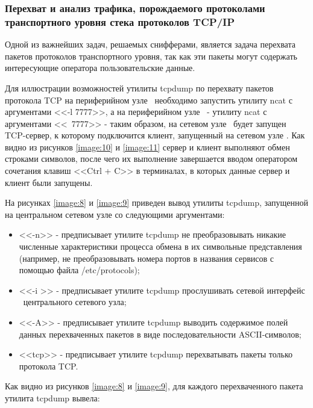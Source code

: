 \subsubsection{Перехват и анализ трафика, порождаемого протоколами транспортного уровня стека протоколов TCP/IP}
\label{task:l4t2}

	Одной из важнейших задач, решаемых снифферами, является задача перехвата пакетов протоколов транспортного уровня,
	так как эти пакеты могут содержать интересующие оператора пользовательские данные.

	Для иллюстрации возможностей утилиты tcpdump по перехвату пакетов протокола TCP на периферийном узле
	\first\ необходимо запустить утилиту ncat с аргументами <<-l 7777>>, а на периферийном узле \second\ - утилиту ncat
	с аргументами <<\first\ 7777>> - таким образом, на сетевом узле \first\ будет запущен TCP-сервер, к которому
	подключится клиент, запущенный на сетевом узле \second.
	Как видно из рисунков \ref{image:10} и \ref{image:11} сервер и клиент выполняют обмен строками символов,
	после чего их выполнение завершается вводом оператором сочетания клавиш <<Ctrl + C>> в терминалах, в которых
	данные сервер и клиент были запущены.

	На рисунках \ref{image:8} и \ref{image:9} приведен вывод утилиты tcpdump, запущенной на центральном сетевом узле
	со следующими аргументами:

		\begin{itemize}

			\item <<-n>> - предписывает утилите tcpdump не преобразовывать никакие численные характеристики процесса
			обмена в их символьные представления (например, не преобразовывать номера портов в названия сервисов с
			помощью файла /etc/protocols);
			\item <<-i \midethf>> - предписывает утилите tcpdump прослушивать сетевой интерфейс \midethf\ центрального
			сетевого узла;
			\item <<-A>> - предписывает утилите tcpdump выводить содержимое полей данных перехваченных пакетов в виде
			последовательности ASCII-символов;
			\item <<tcp>> - предписывает утилите tcpdump перехватывать пакеты только протокола TCP.

		\end{itemize}

	Как видно из рисунков \ref{image:8} и \ref{image:9}, для каждого перехваченного пакета утилита tcpdump вывела:
	
